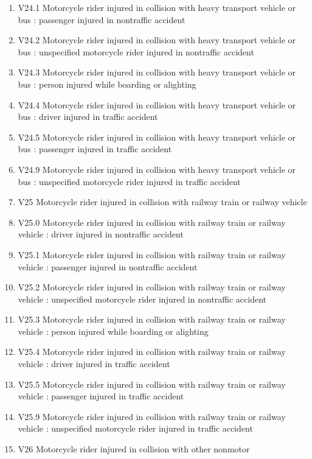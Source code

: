 \documentclass[
]{scrartcl}
\begin{document}
\begin{itemize}
\begin{enumerate}
  \item
    V24.1 Motorcycle rider injured in collision with heavy transport
    vehicle or bus : passenger injured in nontraffic accident
  \item
    V24.2 Motorcycle rider injured in collision with heavy transport
    vehicle or bus : unspecified motorcycle rider injured in nontraffic
    accident
  \item
    V24.3 Motorcycle rider injured in collision with heavy transport
    vehicle or bus : person injured while boarding or alighting
  \item
    V24.4 Motorcycle rider injured in collision with heavy transport
    vehicle or bus : driver injured in traffic accident
  \item
    V24.5 Motorcycle rider injured in collision with heavy transport
    vehicle or bus : passenger injured in traffic accident
  \item
    V24.9 Motorcycle rider injured in collision with heavy transport
    vehicle or bus : unspecified motorcycle rider injured in traffic
    accident
  \item
    V25 Motorcycle rider injured in collision with railway train or
    railway vehicle
  \item
    V25.0 Motorcycle rider injured in collision with railway train or
    railway vehicle : driver injured in nontraffic accident
  \item
    V25.1 Motorcycle rider injured in collision with railway train or
    railway vehicle : passenger injured in nontraffic accident
  \item
    V25.2 Motorcycle rider injured in collision with railway train or
    railway vehicle : unspecified motorcycle rider injured in nontraffic
    accident
  \item
    V25.3 Motorcycle rider injured in collision with railway train or
    railway vehicle : person injured while boarding or alighting
  \item
    V25.4 Motorcycle rider injured in collision with railway train or
    railway vehicle : driver injured in traffic accident
  \item
    V25.5 Motorcycle rider injured in collision with railway train or
    railway vehicle : passenger injured in traffic accident
  \item
    V25.9 Motorcycle rider injured in collision with railway train or
    railway vehicle : unspecified motorcycle rider injured in traffic
    accident
  \item
    V26 Motorcycle rider injured in collision with other nonmotor

\end{enumerate}
\end{itemize}
\end{document}
